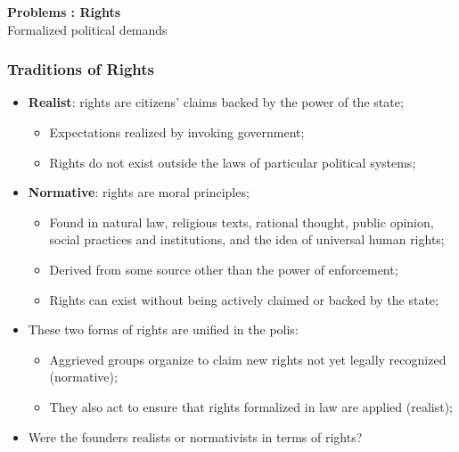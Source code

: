 \documentclass[aspectratio=169]{beamer}
\theoremstyle{principle}
\begin{document}
\begin{frame}

\begin{center}
\Huge\textbf{Problems : Rights}\\
\bigskip
\bigskip
\large Formalized political demands
\end{center}

\end{frame}

\begin{frame}
\frametitle{Traditions of Rights}

\begin{itemize}
\item \textbf{Realist}: rights are citizens' claims backed by the power of the state;
\begin{itemize}
\item Expectations realized by invoking government;
\item Rights do not exist outside the laws of particular political systems;
\end{itemize}
\bigskip
\bigskip
\item \textbf{Normative}: rights are moral principles;
\begin{itemize}
\item Found in natural law, religious texts, rational thought, public opinion, social practices and institutions, and the idea of universal human rights;
\item Derived from some source other than the power of enforcement;
\item Rights can exist without being actively claimed or backed by the state;
\end{itemize}
\bigskip
\bigskip
\item These two forms of rights are unified in the polis:
\begin{itemize}
\item Aggrieved groups organize to claim new rights not yet legally recognized (normative);
\item They also act to ensure that rights formalized in law are applied (realist);
\end{itemize}
\bigskip
\bigskip
\item Were the founders realists or normativists in terms of rights?
\end{itemize}

\end{frame}
\end{document}
